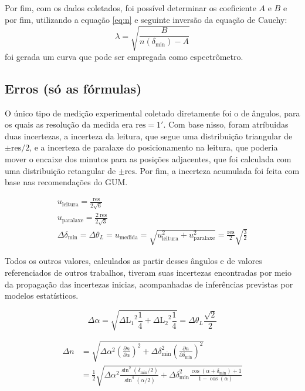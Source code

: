 Por fim, com os dados coletados, foi possível determinar os coeficiente $A$ e $B$ e por fim, utilizando a equação \ref{eq:n} e seguinte inversão da equação de Cauchy:
\begin{equation}
    \lambda = \sqrt{\frac{B}{n\left(\delta_\text{min}\right)-A}}
\end{equation}
foi gerada um curva que pode ser empregada como espectrômetro.


\subsection{Erros (só as fórmulas)}

O único tipo de medição experimental coletado diretamente foi o de ângulos, para os quais as resolução da medida era $\text{res}=\ang{;1;}$. Com base nisso, foram atríbuidas duas incertezas, a incerteza da leitura, que segue uma distribuição triangular de $\pm\text{res}/2$, e a incerteza de paralaxe do posicionamento na leitura, que poderia mover o encaixe dos minutos para as posições adjacentes, que foi calculada com uma distribuição retangular de $\pm\text{res}$. Por fim, a incerteza acumulada foi feita com base nas recomendações do GUM\cite{ref:gum}.

\begin{eqnarray}
    u_{\text{leitura}} = \frac{\text{res}}{2 \sqrt{6}} \\
    u_{\text{paralaxe}} = \frac{2\ \text{res}}{2 \sqrt{3}} \\
    \Delta{\delta_{\text{min}}} = \Delta\theta_L = u_{\text{medida}}
        = \sqrt{u_{\text{leitura}}^2 + u_{\text{paralaxe}}^2}
        = \frac{\text{res}}{2} \sqrt{\frac{3}{2}}
\end{eqnarray}

Todos os outros valores, calculados as partir desses ângulos e de valores referenciados de outros trabalhos, tiveram suas incertezas encontradas por meio da propagação das incertezas inicias, acompanhadas de inferências previstas por modelos estatísticos.

\begin{equation}
    \Delta{\alpha} = \sqrt{{\Delta{\text{L}_1}}^2\frac{1}{4} + {\Delta{\text{L}_2}}^2\frac{1}{4}} = \Delta\theta_L \frac{\sqrt{2}}{2}
\end{equation}

\begin{align}
    \Delta{n} &= \sqrt{
        \Delta{\alpha}^2 \left(\frac{\partial n}{\partial\alpha}\right)^2
        + \Delta{\delta^2_{\text{min}}} \left(\frac{\partial n}{\partial\delta_{\text{min}}}\right)^2
    } \\
    &= \frac{1}{2} \sqrt{
        \Delta{\alpha}^2 \frac{\sin^2(\delta_{\text{min}}/2)}{\sin^4({\alpha/2})}
        + \Delta{\delta^2_{\text{min}}} \frac{\cos(\alpha+\delta_{\text{min}})+1}{1-\cos(\alpha)}
    }
\end{align}


